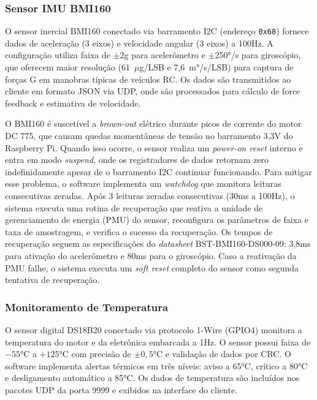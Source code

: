 \subsubsection{Sensor IMU BMI160}

O sensor inercial BMI160 conectado via barramento \gls{I2C} (endereço \texttt{0x68}) fornece dados de aceleração (3 eixos) e velocidade angular (3 eixos) a 100Hz. A configuração utiliza faixa de $\pm$2g para acelerômetro e $\pm$250°/s para giroscópio, que oferecem maior resolução (61~$\mu$g/LSB e 7,6~m°/s/LSB) para captura de forças G em manobras típicas de veículos RC. Os dados são transmitidos ao cliente em formato \gls{JSON} via \gls{UDP}, onde são processados para cálculo de force feedback e estimativa de velocidade.

O BMI160 é suscetível a \textit{brown-out} elétrico durante picos de corrente do motor DC 775, que causam quedas momentâneas de tensão no barramento 3,3V do Raspberry Pi. Quando isso ocorre, o sensor realiza um \textit{power-on reset} interno e entra em modo \textit{suspend}, onde os registradores de dados retornam zero indefinidamente apesar de o barramento \gls{I2C} continuar funcionando. Para mitigar esse problema, o software implementa um \textit{watchdog} que monitora leituras consecutivas zeradas. Após 3 leituras zeradas consecutivas (30ms a 100Hz), o sistema executa uma rotina de recuperação que reativa a unidade de gerenciamento de energia (PMU) do sensor, reconfigura os parâmetros de faixa e taxa de amostragem, e verifica o sucesso da recuperação. Os tempos de recuperação seguem as especificações do \textit{datasheet} BST-BMI160-DS000-09: 3,8ms para ativação do acelerômetro e 80ms para o giroscópio. Caso a reativação da PMU falhe, o sistema executa um \textit{soft reset} completo do sensor como segunda tentativa de recuperação.

\subsubsection{Monitoramento de Temperatura}

O sensor digital DS18B20 \cite{maxim2019ds18b20} conectado via protocolo 1-Wire (GPIO4) monitora a temperatura do motor e da eletrônica embarcada a 1Hz. O sensor possui faixa de $-55$°C a $+125$°C com precisão de $\pm0{,}5$°C e validação de dados por CRC. O software implementa alertas térmicos em três níveis: aviso a 65°C, crítico a 80°C e desligamento automático a 85°C. Os dados de temperatura são incluídos nos pacotes \gls{UDP} da porta 9999 e exibidos na interface do cliente.

